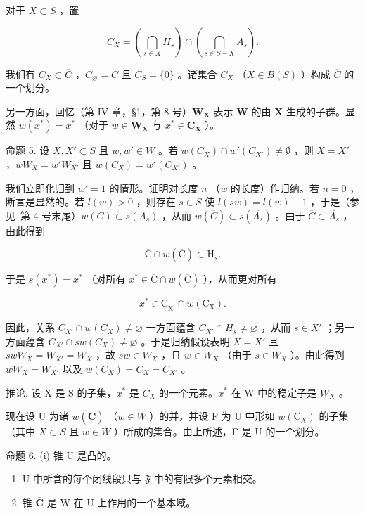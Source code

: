 对于 \(X\subset S\) ，置

\[
C _ {X} = \left(\bigcap_ {s \in X} H _ {s}\right) \cap \left(\bigcap_ {s \in S - X} A _ {s}\right).
\]

我们有 \(C_X \subset \overline{C}\) ，\(C_{\varnothing} = C\) 且 \(C_S = \{0\}\) 。诸集合 \(C_X\) （\(X \in B(S)\) ）构成 \(\overline{C}\) 的一个划分。

另一方面，回忆（第 IV 章，§1，第 8 号）\(\mathbf{W}_{\mathbf{X}}\) 表示 \(\mathbf{W}\) 的由 \(\mathbf{X}\) 生成的子群。显然 \(w(x^{*}) = x^{*}\) （对于 \(w \in \mathbf{W}_{\mathbf{X}}\) 与 \(x^{*} \in \mathbf{C}_{\mathbf{X}}\) ）。

命题 5. 设 \(X, X' \subset S\) 且 \(w, w' \in W\) 。若 \(w(C_X) \cap w'(C_{X'}) \neq \emptyset\) ，则 \(X = X'\) ，\(wW_X = w'W_{X'}\) 且 \(w(C_X) = w'(C_{X'})\) 。

我们立即化归到 \(w' = 1\) 的情形。证明对长度 \(n\) （\(w\) 的长度）作归纳。若 \(n = 0\) ，断言是显然的。若 \(l(w) > 0\) ，则存在 \(s \in S\) 使 \(l(sw) = l(w) - 1\) ，于是（参见~第 4 号末尾）\(w(C) \subset s(A_s)\) ，从而 \(w(\overline{C}) \subset s(\overline{A_s})\) 。由于 \(\overline{C} \subset \overline{A_s}\) ，由此得到

\[
\overline {{{\mathrm{C}}}} \cap w (\overline {{{\mathrm{C}}}}) \subset \mathrm{H} _ {s}.
\]

于是 \(s(x^{*}) = x^{*}\) （对所有 \(x^{*} \in \overline{\mathrm{C}} \cap w(\overline{\mathrm{C}})\) ），从而更对所有

\[
x ^ {*} \in \mathrm{C} _ {\mathrm{X} ^ {\prime}} \cap w (\mathrm{C} _ {\mathrm{X}}).
\]

因此，关系 \(C_{X'} \cap w(C_X) \neq \varnothing\) 一方面蕴含 \(C_{X'} \cap H_s \neq \varnothing\) ，从而 \(s \in X'\) ；另一方面蕴含 \(C_{X'} \cap sw(C_X) \neq \varnothing\) 。于是归纳假设表明 \(X = X'\) 且 \(swW_X = W_{X'} = W_X\) ，故 \(sw \in W_X\) ，且 \(w \in W_X\) （由于 \(s \in W_X\) ）。由此得到 \(wW_X = W_{X'}\) 以及 \(w(C_X) = C_X = C_{X'}\) 。

推论. 设 X 是 S 的子集，\(x^{*}\) 是 \(C_{X}\) 的一个元素。\(x^{*}\) 在 W 中的稳定子是 \(W_{X}\) 。

现在设 U 为诸 \(w(\overline{\mathbf{C}})\) （\(w \in W\) ）的并，并设 F 为 U 中形如 \(w(\mathrm{C}_{X})\) 的子集（其中 \(X \subset S\) 且 \(w \in W\) ）所成的集合。由上所述，F 是 U 的一个划分。

命题 6. (i) 锥 U 是凸的。

\begin{enumerate}
\def\labelenumi{(\roman{enumi})}
\setcounter{enumi}{1}
\item
  U 中所含的每个闭线段只与 \(\mathfrak{F}\) 中的有限多个元素相交。
\item
  锥 \(\overline{\mathbf{C}}\) 是 W 在 U 上作用的一个基本域。
\end{enumerate}


